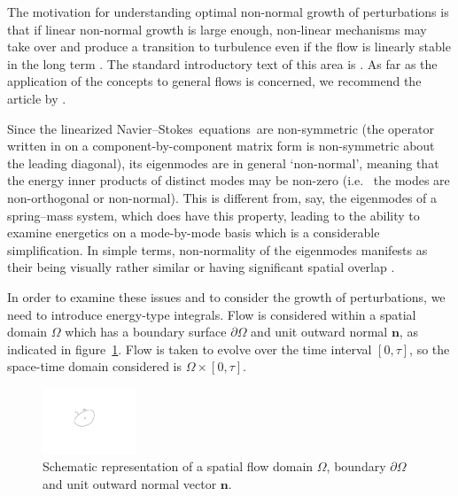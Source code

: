 \documentclass[11pt,a4paper]{report}
\newcommand\NavSto{Navier--Stokes}
\newcommand\LNS{linearized \NavSto}
\newcommand\LNSE{\LNS\ equations}
\newcommand{\ie}{i.e.\ }
\begin{document}
The motivation for understanding optimal non-normal growth of
perturbations is that if linear non-normal growth is large enough,
non-linear mechanisms may take over and produce a transition to
turbulence even if the flow is linearly stable in the long term
\citep[see e.g.][]{srk02}.
%
The standard introductory text of this area is \citet{schmid01}. As
far as the application of the concepts to general flows is concerned,
we recommend the article by \citet{bbs08b}.

Since the \LNSE\ are non-symmetric (the operator written in on a
comp\-on\-ent-by-component matrix form is non-symmetric about the
leading diagonal), its eigenmodes are in general `non-normal', meaning
that the energy inner products of distinct modes may be non-zero (\ie
the modes are non-orthogonal or non-normal).  This is different from,
say, the eigenmodes of a spring--mass system, which does have this
property, leading to the ability to examine energetics on a
mode-by-mode basis which is a considerable simplification.  In simple
terms, non-normality of the eigenmodes manifests as their being
visually rather similar or having significant spatial overlap
\citep[see e.g.][]{kibe07}.

In order to examine these issues and to consider the growth of
perturbations, we need to introduce energy-type integrals.
%
Flow is considered within a spatial domain $\Omega$ which has a
boundary surface $\partial\Omega$ and unit outward normal $\bm{n}$, as
indicated in figure~\ref{fig.domain}.  Flow is taken to evolve over
the time interval $[0,\tau]$, so the space-time domain considered is
$\Omega\times[0,\tau]$.

\begin{figure}
\begin{center}
\includegraphics[width=0.25\textwidth]{generaldomain}
\end{center}
\caption{Schematic representation of a spatial flow domain $\Omega$,
  boundary $\partial\Omega$ and unit outward normal vector $\bm{n}$.}
\label{fig.domain}
\end{figure}
\end{document}
